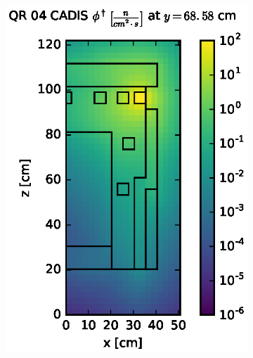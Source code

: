 \begin{figure}[!htb]
\centering
\begin{subfigure}{0.4\textwidth}
\includegraphics[max height=0.445\textheight]
{img/dlvn-plots/cad-adj/flux-qr04-slice.eps}
\end{subfigure} ~
\begin{subfigure}{0.4\textwidth}

\end{subfigure}
\end{figure}
